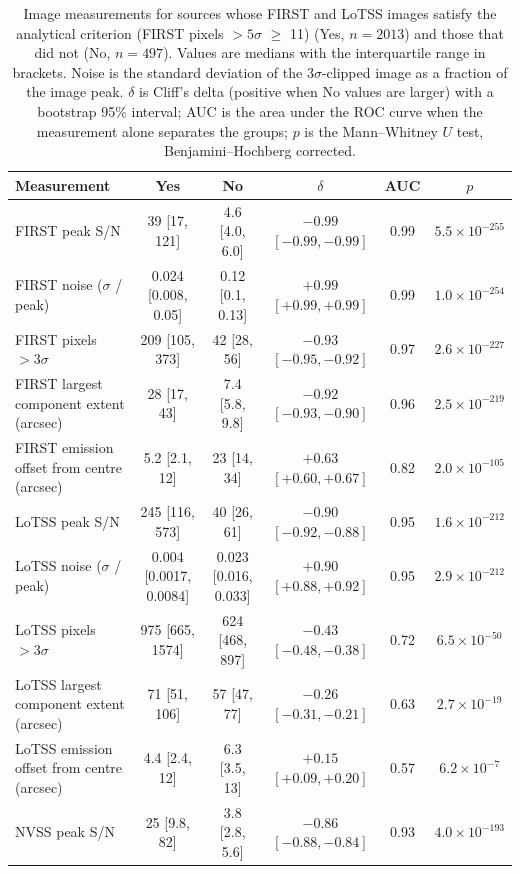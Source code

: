 \begin{table}
\centering
\caption{Image measurements for sources whose FIRST and LoTSS images satisfy the analytical criterion (FIRST pixels $>5\sigma$ $\geq$ 11) (Yes, $n=2013$) and those that did not (No, $n=497$). Values are medians with the interquartile range in brackets. Noise is the standard deviation of the $3\sigma$-clipped image as a fraction of the image peak. $\delta$ is Cliff's delta (positive when No values are larger) with a bootstrap 95\% interval; AUC is the area under the ROC curve when the measurement alone separates the groups; $p$ is the Mann--Whitney $U$ test, Benjamini--Hochberg corrected.}
\label{tab:morphology_analytical}
\begin{tabular}{lccccc}
\hline
Measurement & Yes & No & $\delta$ & AUC & $p$ \\
\hline
FIRST peak S/N & 39 [17, 121] & 4.6 [4.0, 6.0] & $-0.99$ $[-0.99, -0.99]$ & 0.99 & $5.5\times10^{-255}$ \\
FIRST noise ($\sigma$ / peak) & 0.024 [0.008, 0.05] & 0.12 [0.1, 0.13] & $+0.99$ $[+0.99, +0.99]$ & 0.99 & $1.0\times10^{-254}$ \\
FIRST pixels $>3\sigma$ & 209 [105, 373] & 42 [28, 56] & $-0.93$ $[-0.95, -0.92]$ & 0.97 & $2.6\times10^{-227}$ \\
FIRST largest component extent (arcsec) & 28 [17, 43] & 7.4 [5.8, 9.8] & $-0.92$ $[-0.93, -0.90]$ & 0.96 & $2.5\times10^{-219}$ \\
FIRST emission offset from centre (arcsec) & 5.2 [2.1, 12] & 23 [14, 34] & $+0.63$ $[+0.60, +0.67]$ & 0.82 & $2.0\times10^{-105}$ \\
LoTSS peak S/N & 245 [116, 573] & 40 [26, 61] & $-0.90$ $[-0.92, -0.88]$ & 0.95 & $1.6\times10^{-212}$ \\
LoTSS noise ($\sigma$ / peak) & 0.004 [0.0017, 0.0084] & 0.023 [0.016, 0.033] & $+0.90$ $[+0.88, +0.92]$ & 0.95 & $2.9\times10^{-212}$ \\
LoTSS pixels $>3\sigma$ & 975 [665, 1574] & 624 [468, 897] & $-0.43$ $[-0.48, -0.38]$ & 0.72 & $6.5\times10^{-50}$ \\
LoTSS largest component extent (arcsec) & 71 [51, 106] & 57 [47, 77] & $-0.26$ $[-0.31, -0.21]$ & 0.63 & $2.7\times10^{-19}$ \\
LoTSS emission offset from centre (arcsec) & 4.4 [2.4, 12] & 6.3 [3.5, 13] & $+0.15$ $[+0.09, +0.20]$ & 0.57 & $6.2\times10^{-7}$ \\
NVSS peak S/N & 25 [9.8, 82] & 3.8 [2.8, 5.6] & $-0.86$ $[-0.88, -0.84]$ & 0.93 & $4.0\times10^{-193}$ \\

\end{tabular}
\end{table}

